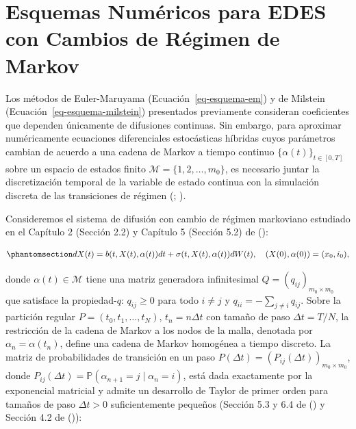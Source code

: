 \documentclass[
  spanish,
  us-letterpaper,
]{scrreprt}
\numberwithin{equation}{section}
\theoremstyle{plain}
\theoremstyle{plain}
\theoremstyle{plain}
\theoremstyle{definition}
\theoremstyle{remark}
\begin{document}
\section{Esquemas Numéricos para EDES con Cambios de Régimen de
Markov}\label{sec-numerico-switching}

Los métodos de Euler-Maruyama (Ecuación~\ref{eq-esquema-em}) y de
Milstein (Ecuación~\ref{eq-esquema-milstein}) presentados previamente
consideran coeficientes que dependen únicamente de difusiones continuas.
Sin embargo, para aproximar numéricamente ecuaciones diferenciales
estocásticas híbridas cuyos parámetros cambian de acuerdo a una cadena
de Markov a tiempo continuo \(\{\alpha(t)\}_{t \in [0, T]}\) sobre un
espacio de estados finito \(\mathcal{M} = \{1, 2, \dots, m_0\}\), es
necesario juntar la discretización temporal de la variable de estado
continua con la simulación discreta de las transiciones de régimen
(;
).

Consideremos el sistema de difusión con cambio de régimen markoviano
estudiado en el Capítulo 2 (Sección 2.2) y Capítulo 5 (Sección 5.2) de
():

\begin{equation}\phantomsection\label{eq-ede-switching-num}{
dX(t) = b(t, X(t), \alpha(t))dt + \sigma(t, X(t), \alpha(t))dW(t), \quad (X(0), \alpha(0)) = (x_0, i_0),
}\end{equation}

donde \(\alpha(t) \in \mathcal{M}\) tiene una matriz generadora
infinitesimal \(Q = (q_{ij})_{m_0 \times m_0}\) que satisface la
propiedad-\(q\): \(q_{ij} \ge 0\) para todo \(i \neq j\) y
\(\displaystyle q_{ii} = -\sum_{j \neq i} q_{ij}\). Sobre la partición
regular \(P = (t_0, t_1, \dots, t_N)\), \(t_n = n\Delta t\) con tamaño
de paso \(\Delta t = T/N\), la restricción de la cadena de Markov a los
nodos de la malla, denotada por \(\alpha_n = \alpha(t_n)\), define una
cadena de Markov homogénea a tiempo discreto. La matriz de
probabilidades de transición en un paso
\(P(\Delta t) = (P_{ij}(\Delta t))_{m_0 \times m_0}\), donde
\(P_{ij}(\Delta t) = \mathbb{P}(\alpha_{n+1} = j \mid \alpha_n = i)\),
está dada exactamente por la exponencial matricial y admite un
desarrollo de Taylor de primer orden para tamaños de paso
\(\Delta t > 0\) suficientemente pequeños (Sección 5.3 y 6.4 de
() y Sección 4.2 de
()):
\end{document}

